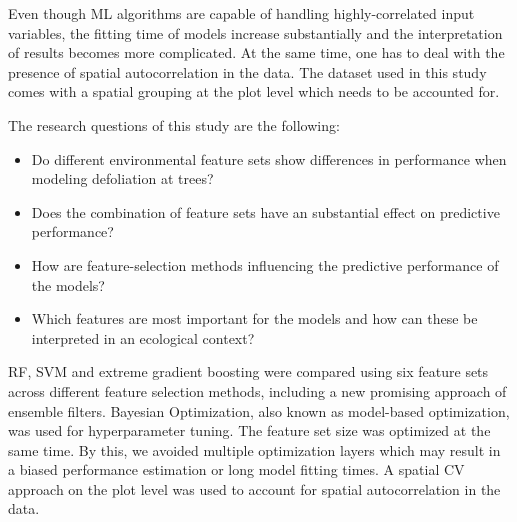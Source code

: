 \documentclass[letterpaper, peerreview]{IEEEtran}
\begin{document}
Even though \ac{ML} algorithms are capable of handling highly-correlated input variables, the fitting time of models increase substantially and the interpretation of results becomes more complicated.
At the same time, one has to deal with the presence of spatial autocorrelation in the data.
The dataset used in this study comes with a spatial grouping at the plot level which needs to be accounted for.

The research questions of this study are the following:

\begin{itemize}

	\item Do different environmental feature sets show differences in performance when modeling defoliation at trees?
	      
	\item Does the combination of feature sets have an substantial effect on predictive performance?
	      
	\item How are feature-selection methods influencing the predictive performance of the models?
	      
	\item Which features are most important for the models and how can these be interpreted in an ecological context?
	      
\end{itemize}

\noindent \ac{RF}, \ac{SVM} and extreme gradient boosting were compared using six feature sets across different feature selection methods, including a new promising approach of ensemble filters.
Bayesian Optimization, also known as model-based optimization, was used for hyperparameter tuning.
The feature set size was optimized at the same time.
By this, we avoided multiple optimization layers which may result in a biased performance estimation or long model fitting times.
A spatial \ac{CV} approach on the plot level was used to account for spatial autocorrelation in the data.


%
%
\end{document}

